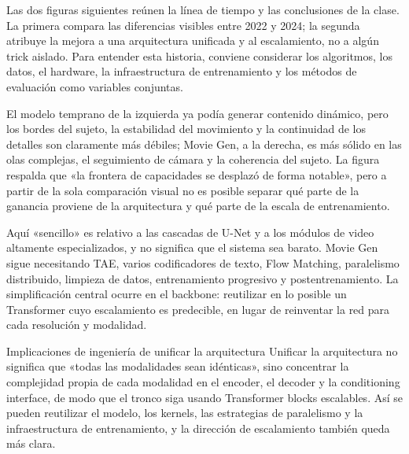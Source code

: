 Las dos figuras siguientes reúnen la línea de tiempo y las conclusiones de la clase. La primera compara las diferencias visibles entre 2022 y 2024; la segunda atribuye la mejora a una arquitectura unificada y al escalamiento, no a algún trick aislado. Para entender esta historia, conviene considerar los algoritmos, los datos, el hardware, la infraestructura de entrenamiento y los métodos de evaluación como variables conjuntas.


El modelo temprano de la izquierda ya podía generar contenido dinámico, pero los bordes del sujeto, la estabilidad del movimiento y la continuidad de los detalles son claramente más débiles; Movie Gen, a la derecha, es más sólido en las olas complejas, el seguimiento de cámara y la coherencia del sujeto. La figura respalda que «la frontera de capacidades se desplazó de forma notable», pero a partir de la sola comparación visual no es posible separar qué parte de la ganancia proviene de la arquitectura y qué parte de la escala de entrenamiento.


Aquí «sencillo» es relativo a las cascadas de U-Net y a los módulos de video altamente especializados, y no significa que el sistema sea barato. Movie Gen sigue necesitando TAE, varios codificadores de texto, Flow Matching, paralelismo distribuido, limpieza de datos, entrenamiento progresivo y postentrenamiento. La simplificación central ocurre en el backbone: reutilizar en lo posible un Transformer cuyo escalamiento es predecible, en lugar de reinventar la red para cada resolución y modalidad.

\begin{importantbox}{Implicaciones de ingeniería de unificar la arquitectura}
Unificar la arquitectura no significa que «todas las modalidades sean idénticas», sino concentrar la complejidad propia de cada modalidad en el encoder, el decoder y la conditioning interface, de modo que el tronco siga usando Transformer blocks escalables. Así se pueden reutilizar el modelo, los kernels, las estrategias de paralelismo y la infraestructura de entrenamiento, y la dirección de escalamiento también queda más clara.
\end{importantbox}


